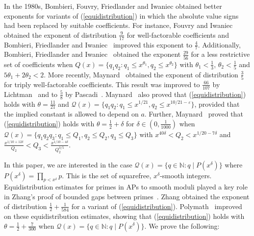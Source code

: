 \documentclass{amsart}
\numberwithin{equation}{section}
\begin{document}
\vspace{3mm}
In the 1980s, Bombieri, Fouvry, Friedlander and Iwaniec obtained better exponents for   variants of (\ref{equidistribution})  in which the absolute value signs had been replaced by suitable coefficients. For instance, Fouvry and Iwaniec~\cite{Fouvry:1983:PAP} obtained the exponent of distribution $\frac{9}{17}$ for well-factorable coefficients and Bombieri, Friedlander and Iwaniec~\cite{Bombieri:2986:PAP} improved this exponent to $\frac{4}{7}$. Additionally, Bombieri, Friedlander and Iwaniec~\cite{Bombieri:2986:PAP} obtained the exponent  $\frac{29}{56}$  for a less restrictive set of coefficients when $Q(x) = \{q_1q_2:q_1 \leq x^{\theta_1}, q_2 \leq x^{\theta_2} \}$ with $\theta_1<\frac{1}{3}$, $\theta_2<\frac{1}{5}$ and $5\theta_1+2\theta_2<2$. More recently, Maynard~\cite{Maynard:2022:PA2} obtained the exponent of distribution  $\frac{3}{5}$ for triply well-factorable coefficients. This result  was improved to $\frac{66}{107}$ by Lichtman~\cite{Lichtman:2023:TWF} and to $\frac{5}{8}$ by
Pascadi~\cite{Pascadi:2024:TWF}.
 Maynard~\cite{Maynard:2022:PA1} also proved that (\ref{equidistribution}) holds with $\theta = \frac{11}{21}$ and $\mathcal{Q}(x) = \{q_1q_2: q_1 \leq x^{1/21}, q_2 \leq x^{10/21-\varepsilon}\}$, provided that the implied constant is allowed to depend on $a$. Further, Maynard~\cite{Maynard:2022:PA3}  proved that (\ref{equidistribution}) holds with $\theta = \frac{1}{2} + \delta$ for $\delta \in (0, \frac{1}{1000})$  when $\mathcal{Q}(x) = \{q_1q_2q_3: q_1 \leq Q_1, q_2 \leq Q_2, q_3 \leq Q_3\}$ with  $x^{40\delta} < Q_2 < x^{1/20-7\delta}$ and $\frac{x^{1/10+12\delta}}{Q_2} <Q_3< \frac{x^{1/10-4\delta}}{Q_2^{3/5}}$.

\vspace{3mm} In this paper, we are interested in the case $\mathcal{Q}(x) = \{ q \in \mathbb{N}: q \mid P(x^\delta)\}$ where $P(x^\delta) = \prod_{p < x^\delta} p$. This is the set of squarefree, $x^\delta$-smooth integers. Equidistribution estimates for primes in APs to smooth moduli played a key role in Zhang's proof of bounded gaps between primes~\cite{Zhang:2015:BGP}. Zhang obtained the exponent of distribution $\frac{1}{2}+\frac{1}{584}$ for a variant of (\ref{equidistribution}). Polymath~\cite{Polymath:2014:EDZ} improved on these equidistribution estimates, showing that (\ref{equidistribution}) holds with $\theta = \frac{1}{2} + \frac{7}{300}$ when $\mathcal{Q}(x) = \{ q \in \mathbb{N}: q \mid P(x^\delta)\}$. We prove the following:
\end{document}
